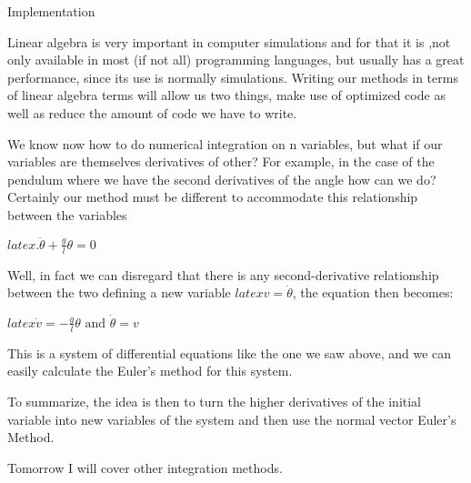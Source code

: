     Implementation

Linear algebra is very important in computer simulations and for that it is ,not only available in most (if not all) programming languages, but usually has a great performance, since its use is normally simulations. Writing our methods in terms of linear algebra terms will allow us two things, make use of optimized code as well as reduce the amount of code we have to write.

We know now how to do numerical integration on n variables, but what if our variables are themselves derivatives of other? For example, in the case of the pendulum where we have the second derivatives of the angle how can we do? Certainly our method must be different to accommodate this relationship between the variables

$latex.\ddot \theta + \frac{g}{l}\theta = 0 $

Well, in fact we can disregard that there is any second-derivative relationship between the two defining a new variable $latex v = \dot \theta $, the equation then becomes:

$latex \dot v = -\frac{g}{l} \theta \text{ and } \dot \theta = v$

This is a system of differential equations like the one we saw above, and we can easily calculate the Euler's method for this system.

To summarize, the idea is then to turn the higher derivatives of the initial variable into new variables of the system and then use the normal vector Euler's Method.

Tomorrow I will cover other integration methods.
